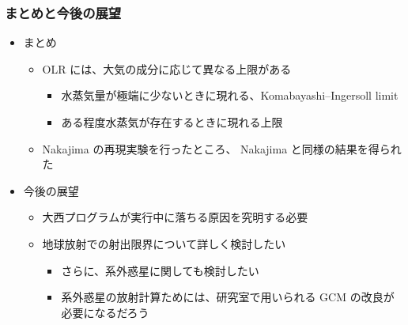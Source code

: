 \documentclass[aspectratio=149]{beamer}
\begin{document}
\begin{frame}
	\frametitle{まとめと今後の展望}
	\begin{itemize}
		\item まとめ
			\begin{itemize}
				\item OLR には、大気の成分に応じて異なる上限がある
					\begin{itemize}
						\item 水蒸気量が極端に少ないときに現れる、Komabayashi--Ingersoll limit
						\item ある程度水蒸気が存在するときに現れる上限
					\end{itemize}
				\item Nakajima \etal の再現実験を行ったところ、
					Nakajima \etal と同様の結果を得られた
			\end{itemize}
		\item 今後の展望
			\begin{itemize}
				\item 大西プログラムが実行中に落ちる原因を究明する必要
				\item 地球放射での射出限界について詳しく検討したい
					\begin{itemize}
						\item さらに、系外惑星に関しても検討したい
						\item 系外惑星の放射計算ためには、研究室で用いられる
							GCM の改良が必要になるだろう
					\end{itemize}
			\end{itemize}
	\end{itemize}
\end{frame}
\end{document}
